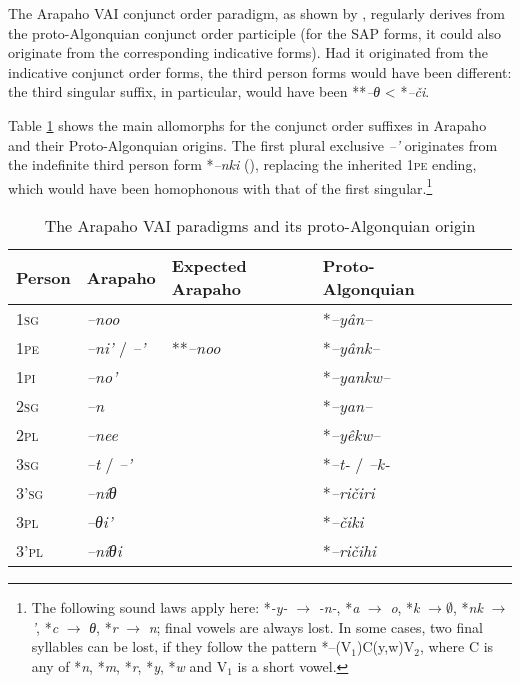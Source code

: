 \documentclass[twoside,a4paper,11pt]{article}
\newcommand{\ipa}[1]{{\phon\textit{#1}}}
\newcommand{\sg}{\textsc{sg}}
\newcommand{\pl}{\textsc{pl}}
\newcommand{\grise}[1]{\cellcolor{lightgray}\textbf{#1}}
\newcommand{\Σ}{\greek{Σ}}
\newcommand{\pli}{\textsc{pi}}
\newcommand{\pe}{\textsc{pe}}
\begin{document}
The Arapaho VAI conjunct order paradigm, as shown by \citet[16-7]{goddard65arapaho}, regularly derives from the proto-Algonquian conjunct order participle (for the SAP forms, it could also originate from the corresponding indicative forms). Had it originated from the indicative conjunct order forms, the third person forms would have been different: the third singular suffix, in particular, would have been **\ipa{--θ} < *\ipa{--či}.

Table \ref{tab:arapaho.vai} shows the main  allomorphs for the conjunct order suffixes in Arapaho and their Proto-Algonquian origins. The first plural exclusive \ipa{--'} originates from the indefinite third person form *\ipa{--nki} (\citealt{goddard98morphology.arapaho}), replacing the inherited 1\pe{} ending, which would have been homophonous with that of the first singular.\footnote{The following sound laws apply here: *\ipa{-y-} $\rightarrow$ \ipa{-n-}, *\ipa{a} $\rightarrow$ \ipa{o}, *\ipa{k} $\rightarrow \emptyset $, *\ipa{nk} $\rightarrow$ \ipa{'}, *\ipa{c} $\rightarrow$ \ipa{θ},  *\ipa{r} $\rightarrow$ \ipa{n}; final vowels are always lost. In some cases, two final syllables can be lost, if they follow the pattern *--(V${_1}$)C(y,w)V${_2}$, where C is any of *\ipa{n}, *\ipa{m}, *\ipa{r}, *\ipa{y}, *\ipa{w} and V${_1}$ is a short vowel. }


\begin{table}[H]
\caption{The Arapaho VAI paradigms and its proto-Algonquian origin}
\centering \label{tab:arapaho.vai}
\begin{tabular}{lllllll}
\toprule
Person &   Arapaho    & Expected Arapaho &Proto-Algonquian\\
\midrule
1\sg{}& 	\ipa{--noo} & & 	*\ipa{--yân--} & 	\\	
1\pe{} & 	\ipa{--ni'} /  	\ipa{--'} \grise{} & **\ipa{--noo}	&	 *\ipa{--yânk--}	 \\	
1\pli{} & 	\ipa{--no'} & 	 	&	*\ipa{--yankw--} & 	\\	
\midrule
2\sg{}& 	\ipa{--n} & 	 &	*\ipa{--yan--} & 	\\	
2\pl{}& 	\ipa{--nee} & 	 & 		*\ipa{--yêkw--} & 	\\	
\midrule
3\sg{} & 	\ipa{--t} /	\ipa{--'} & 	&	*\ipa{--t-} / \ipa{--k-}& 	\\	
3'\sg{} & 	\ipa{--níθ} &  	&	*\ipa{--ričiri} & 	\\	
3\pl{}& 	\ipa{--θi'} &  	&	*\ipa{--čiki} 	\\	
3'\pl{}& 	\ipa{--níθi} & 	 &		*\ipa{--ričihi} 	\\	
\bottomrule
\end{tabular}
\end{table}
\end{document}

